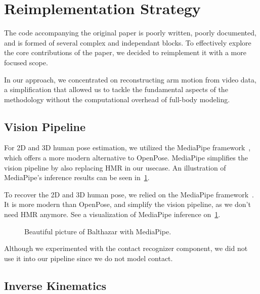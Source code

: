 \section{Reimplementation Strategy}
\label{sec:remplementation}

The code accompanying the original paper  is poorly written, poorly documented, and is formed of several complex and independant blocks. 
To effectively explore the core contributions of the paper, we decided to reimplement it with a more focused scope.

In our approach, we concentrated on reconstructing arm motion from video data, a simplification that allowed us to tackle the fundamental 
aspects of the methodology without the computational overhead of full-body modeling.

\subsection{Vision Pipeline}
\label{subsec:vision_pipeline}

For 2D and 3D human pose estimation, we utilized the MediaPipe framework~\cite{lugaresi2019mediapipe}, which offers a more modern alternative 
to OpenPose. MediaPipe simplifies the vision pipeline by also replacing HMR in our usecase. An illustration of MediaPipe's inference results 
can be seen in~\cref{fig:mediapipe}.

To recover the 2D and 3D human pose, we relied on the MediaPipe framework~\cite{lugaresi2019mediapipe}. It is more modern than OpenPose, and 
simplify the vision pipeline, as we don't need HMR anymore. See a visualization of MediaPipe inference on~\cref{fig:mediapipe}.

\begin{figure}
    \centering
    \fbox{\rule{0pt}{2in} \rule{0.9\linewidth}{0pt}}
    \caption{Beautiful picture of Balthazar with MediaPipe.}
    \label{fig:mediapipe}
\end{figure}

Although we experimented with the contact recognizer component, we did not use it into our pipeline since we do not model contact.

\subsection{Inverse Kinematics}